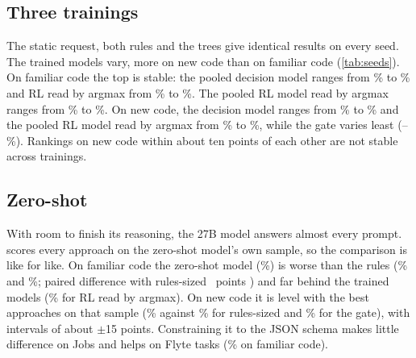 \subsection{Three trainings}
\label{sec:res-seeds}

The static request, both rules and the trees give identical results on every seed. The trained models vary, more on
new code than on familiar code (\cref{tab:seeds}). On familiar code the top is stable: the pooled decision model ranges
from \loTestPoolDec\% to \hiTestPoolDec\% and RL read by argmax from \loTestRLArg\% to \hiTestRLArg\%. The pooled RL
model read by argmax ranges from \loTestPoolRLArg\% to \hiTestPoolRLArg\%. On new code, the decision model ranges from
\loUnseenDec\% to \hiUnseenDec\% and the pooled RL model read by argmax from \loUnseenPoolRLArg\% to
\hiUnseenPoolRLArg\%, while the gate varies least (\loUnseenGate--\hiUnseenGate\%). Rankings on new code within about
ten points of each other are not stable across trainings.

\begin{table}[tbp]
\centering\small
\caption{Job regret (\%) for each of the three trainings. The static request, the rules and the trees give identical
results on every seed.}
\label{tab:seeds}

\end{table}

\subsection{Zero-shot}
\label{sec:res-zs}

With room to finish its reasoning, the 27B model answers almost every prompt.  scores every approach on
the zero-shot model's own sample, so the comparison is like for like. On familiar code the zero-shot model
(\zsTestZS\%) is worse than the rules (\zsTestRules\% and \zsTestSized\%; paired difference with rules-sized
\diffTestZSSized\ points \diffTestZSSizedCI) and far behind the trained models (\zsTestRLArg\% for RL read by argmax). On
new code it is level with the best approaches on that sample (\zsUnseenZS\% against \zsUnseenSized\% for rules-sized and
\zsUnseenGate\% for the gate), with intervals of about $\pm$15 points. Constraining it to the JSON schema makes little
difference on Jobs and helps on Flyte tasks (\rFTestZSJ\% on familiar code).
